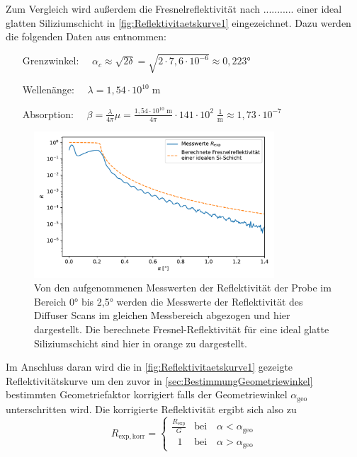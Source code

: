     Zum Vergleich wird außerdem die Fresnelreflektivität nach ........... einer ideal glatten Siliziumschicht in \autoref{fig:Reflektivitaetskurve1} eingezeichnet. Dazu werden die folgenden Daten aus \cite{tu_dortmund_versuchsanleitung_2021_e1} entnommen:
    \begin{enumerate}
        \setlength{\itemindent}{70pt}
        \item[Grenzwinkel:] $\quad \alpha_c \approx \sqrt{2 \delta} = \sqrt{2 \cdot 7,6 \cdot 10^{-6}} \approx 0,223°$
        \item[Wellenänge:] $\quad \lambda = 1,54 \cdot 10^{10} \;$m 
        \item[Absorption:] $\quad \beta = \frac{\lambda}{4 \pi} \mu = \frac{1,54 \cdot 10^{10} \; \mathrm{m}}{4 \pi} \cdot 141 \cdot 10^2 \; \frac{1}{\mathrm{m}} \approx 1,73 \cdot 10^{-7}$ 
    \end{enumerate}
    \begin{figure}[ht]
        \centering
        \includegraphics[width = 0.8\textwidth]{plots/Reflektivitaetskurve1.pdf}
        \caption{Von den aufgenommenen Messwerten der Reflektivität der Probe im Bereich 0° bis 2,5° werden die Messwerte der Reflektivität des \glqq Diffuser Scans\grqq{} im gleichen Messbereich abgezogen und hier dargestellt. Die berechnete Fresnel-Reflektivität für eine ideal glatte Siliziumschicht sind hier in orange zu dargestellt.}
        \label{fig:Reflektivitaetskurve1}
    \end{figure}

    Im Anschluss daran wird die in \autoref{fig:Reflektivitaetskurve1} gezeigte Reflektivitätskurve um den zuvor in \autoref{sec:BestimmungGeometriewinkel} bestimmten Geometriefaktor korrigiert falls der Geometriewinkel $\alpha_{\mathrm{geo}}$ unterschritten wird. Die korrigierte Reflektivität ergibt sich also zu
    \begin{equation*}
        R_{\mathrm{exp, korr}} =
        \begin{cases}
            \frac{R_{\mathrm{exp}}}{G} & \mathrm{bei} \quad \alpha < \alpha_{\mathrm{geo}} \\[3pt]
            \hspace{7pt} 1 & \mathrm{bei} \quad \alpha > \alpha_{\mathrm{geo}}
        \end{cases}
    \end{equation*}

